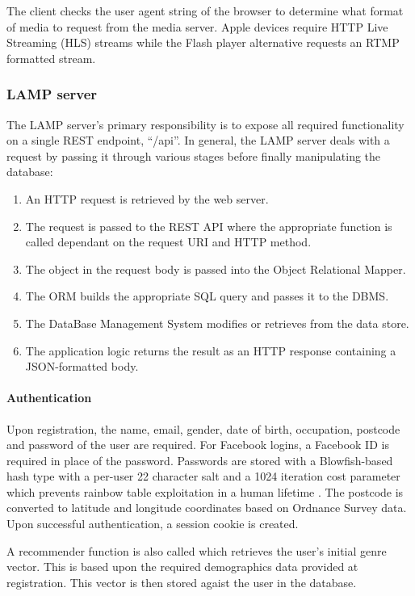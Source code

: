 The client checks the user agent string of the browser to determine what format of media to request from the media server. Apple devices require HTTP Live Streaming (HLS) streams while the Flash player alternative requests an RTMP formatted stream.

\subsubsection{LAMP server}

The LAMP server's primary responsibility is to expose all required functionality on a single REST endpoint, ``/api''. In general, the LAMP server deals with a request by passing it through various stages before finally manipulating the database:

\begin{enumerate}
	\item An HTTP request is retrieved by the web server.
	\item The request is passed to the REST API where the appropriate function is called dependant on the request URI and HTTP method.
	\item The object in the request body is passed into the Object Relational Mapper.
	\item The ORM builds the appropriate SQL query and passes it to the DBMS.
	\item The DataBase Management System modifies or retrieves from the data store.
	\item The application logic returns the result as an HTTP response containing a JSON-formatted body.
\end{enumerate}

\paragraph{Authentication}

Upon registration, the name, email, gender, date of birth, occupation, postcode and password of the user are required. For Facebook logins, a Facebook ID is required in place of the password. Passwords are stored with a Blowfish-based hash type with a per-user 22 character salt and a 1024 iteration cost parameter which prevents rainbow table exploitation in a human lifetime \citep{hashing}. The postcode is converted to latitude and longitude coordinates based on Ordnance Survey data. Upon successful authentication, a session cookie is created.

A recommender function is also called which retrieves the user's initial genre vector. This is based upon the required demographics data provided at registration. This vector is then stored agaist the user in the database.

